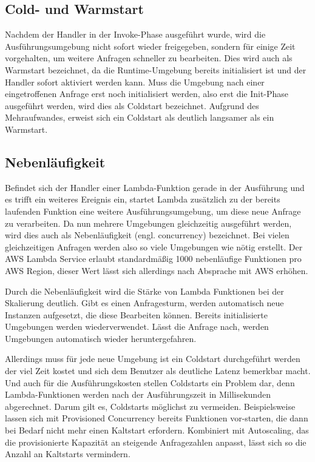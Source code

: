 \subsection{Cold- und Warmstart}
Nachdem der Handler in der Invoke-Phase ausgeführt wurde, wird die Ausführungsumgebung nicht sofort wieder freigegeben, sondern für einige Zeit vorgehalten, um weitere Anfragen schneller zu bearbeiten. Dies wird auch als Warmstart bezeichnet, da die Runtime-Umgebung bereits initialisiert ist und der Handler sofort aktiviert werden kann.
Muss die Umgebung nach einer eingetroffenen Anfrage erst noch initialisiert werden, also erst die Init-Phase ausgeführt werden, wird dies als Coldstart bezeichnet. Aufgrund des Mehraufwandes, erweist sich ein Coldstart als deutlich langsamer als ein Warmstart.

\subsection{Nebenläufigkeit}
Befindet sich der Handler einer Lambda-Funktion gerade in der Ausführung und es trifft ein weiteres Ereignis ein, startet Lambda zusätzlich zu der bereits laufenden Funktion eine weitere Ausführungsumgebung, um diese neue Anfrage zu verarbeiten. Da nun mehrere Umgebungen gleichzeitig ausgeführt werden, wird dies auch als Nebenläufigkeit (engl. concurrency) bezeichnet. Bei vielen gleichzeitigen Anfragen werden also so viele Umgebungen wie nötig erstellt. Der AWS Lambda Service erlaubt standardmäßig 1000 nebenläufige Funktionen pro AWS Region, dieser Wert lässt sich allerdings nach Absprache mit AWS erhöhen.

Durch die Nebenläufigkeit wird die Stärke von Lambda Funktionen bei der Skalierung deutlich. Gibt es einen Anfragesturm, werden automatisch neue Instanzen aufgesetzt, die diese Bearbeiten können. Bereits initialisierte Umgebungen werden wiederverwendet. Lässt die Anfrage nach, werden Umgebungen automatisch wieder heruntergefahren. 

Allerdings muss für jede neue Umgebung ist ein Coldstart durchgeführt werden der viel Zeit kostet und sich dem Benutzer als deutliche Latenz bemerkbar macht. Und auch für die Ausführungskosten stellen Coldstarts ein Problem dar, denn Lambda-Funktionen werden nach der Ausführungszeit in Millisekunden abgerechnet. Darum gilt es, Coldstarts möglichst zu vermeiden. Beispielsweise lassen sich mit Provisioned Concurrency bereits Funktionen vor-starten, die dann bei Bedarf nicht mehr einen Kaltstart erfordern. Kombiniert mit Autoscaling, das die provisionierte Kapazität an steigende Anfragezahlen anpasst, lässt sich so die Anzahl an Kaltstarts vermindern.

